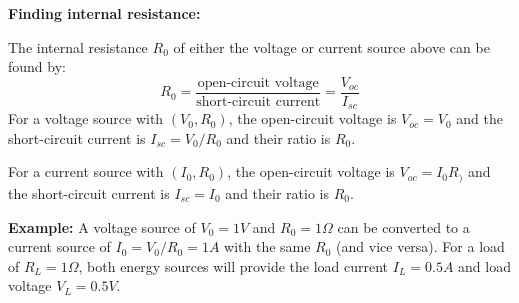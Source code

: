 \textwidth 6.0in
\topmargin -0.5in
\oddsidemargin -0in
\evensidemargin -0.5in





{\bf Finding internal resistance:}

The internal resistance $R_0$ of either the voltage or current source 
above can be found by:
\[ R_0=\frac{\mbox{open-circuit voltage}}{\mbox{short-circuit current}}
  =\frac{V_{oc}}{I_{sc}} \]
For a voltage source with $(V_0, R_0)$, the open-circuit voltage is
$V_{oc}=V_0$ and the short-circuit current is $I_{sc}=V_0/R_0$ and
their ratio is $R_0$.

For a current source with $(I_0, R_0)$, the open-circuit voltage is
$V_{oc}=I_0R_)$ and the short-circuit current is $I_{sc}=I_0$ and
their ratio is $R_0$.

{\bf Example:} A voltage source of $V_0=1V$ and $R_0=1\Omega$ can be
converted to a current source of $I_0=V_0/R_0=1A$ with the same $R_0$
(and vice versa). For a load of $R_L=1\Omega$, both energy sources will
provide the load current $I_L=0.5A$ and load voltage $V_L=0.5V$.






	

	


